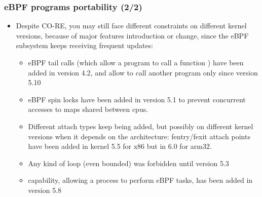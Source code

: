 \begin{frame}
  \frametitle{eBPF programs portability (2/2)}
  \begin{itemize}
    \item Despite CO-RE, you may still face different constraints on different
    kernel versions, because of major features introduction or change, since
    the eBPF subsystem keeps receiving frequent updates:
    \begin{itemize}
      \item eBPF tail calls (which allow a program to call a function ) have
      been added in version 4.2, and allow to call another program only since
      version 5.10
      \item eBPF spin locks have been added in version 5.1 to prevent
      concurrent accesses to maps shared between cpus.
      \item Different attach types keep being added, but possibly on different
      kernel versions when it depends on the architecture: fentry/fexit attach
      points have been added in kernel 5.5 for x86 but in 6.0 for arm32.
      \item Any kind of loop (even bounded) was forbidden until version 5.3
      \item {} capability, allowing a process to perform eBPF tasks, has
      been added in version 5.8
    \end{itemize}
  \end{itemize}
\end{frame}

